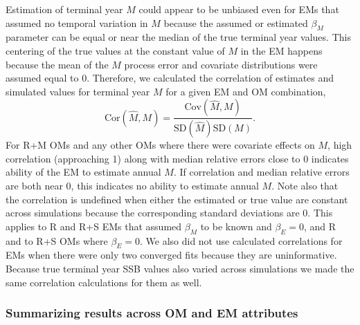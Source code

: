 \documentclass[
  12pt,
]{article}
\begin{document}
Estimation of terminal year \(M\) could appear to be unbiased even for EMs that assumed no temporal variation in \(M\) because the assumed or estimated \(\beta_M\) parameter can be equal or near the median of the true terminal year values. This centering of the true values at the constant value of \(M\) in the EM happens because the mean of the \(M\) process error and covariate distributions were assumed equal to 0. Therefore, we calculated the correlation of estimates and simulated values for terminal year \(M\) for a given EM and OM combination,
\[
\text{Cor}\left(\widehat M, M\right) = \frac{\text{Cov}\left(\widehat M, M\right)}{\text{SD}\left(\widehat M\right)\text{SD}\left(M\right)}.
\]
For R+M OMs and any other OMs where there were covariate effects on \(M\), high correlation (approaching 1) along with median relative errors close to 0 indicates ability of the EM to estimate annual \(M\). If correlation and median relative errors are both near 0, this indicates no ability to estimate annual \(M\). Note also that the correlation is undefined when either the estimated or true value are constant across simulations because the corresponding standard deviations are 0. This applies to R and R+S EMs that assumed \(\beta_M\) to be known and \(\beta_E = 0\), and R and to R+S OMs where \(\beta_E = 0\). We also did not use calculated correlations for EMs when there were only two converged fits because they are uninformative. Because true terminal year SSB values also varied across simulations we made the same correlation calculations for them as well.

\subsubsection*{Summarizing results across OM and EM attributes}\label{summarizing-results-across-om-and-em-attributes}
\end{document}

